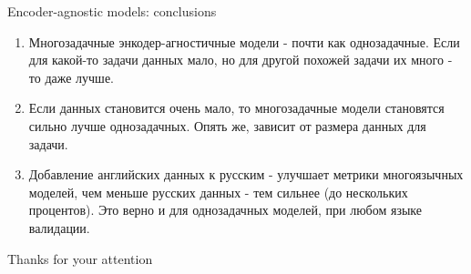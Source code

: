 \begin{frame}{Encoder-agnostic models: conclusions}
\begin{enumerate}
\item Многозадачные энкодер-агностичные модели - почти как однозадачные. Если для какой-то задачи данных мало, но для другой похожей задачи их много - то даже лучше.
\item Если данных становится очень мало, то многозадачные модели становятся сильно лучше однозадачных. Опять же, зависит от размера данных для задачи.
\item Добавление английских данных к русским - улучшает метрики многоязычных моделей, чем меньше русских данных - тем сильнее (до нескольких процентов). Это верно и для однозадачных моделей, при любом языке валидации.
\end{enumerate}
\end{frame}

\begin{frame}{Thanks for your attention}
\end{frame}
